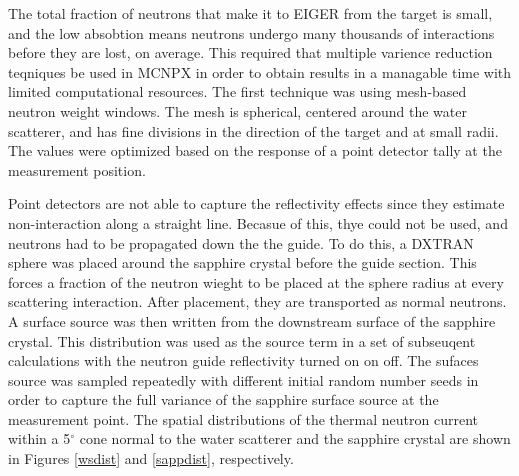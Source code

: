 \documentclass[a4paper,
              ]{jacow}
\begin{document}
The total fraction of neutrons that make it to EIGER from the target is small, and the low absobtion means neutrons undergo many thousands of interactions before they are lost, on average.  This required that multiple varience reduction teqniques be used in MCNPX in order to obtain results in a managable time with limited computational resources.  The first technique was using mesh-based neutron weight windows.  The mesh is spherical, centered around the water scatterer, and has fine divisions in the direction of the target and at small radii.  The values were optimized based on the response of a point detector tally at the measurement position.  %


Point detectors are not able to capture the reflectivity effects since they estimate non-interaction along a straight line.  Becasue of this, thye could not be used, and neutrons had to be propagated down the the guide.  To do this, a DXTRAN sphere was placed around the sapphire crystal before the guide section.  This forces a fraction of the neutron wieght to be placed at the sphere radius at every scattering interaction.  After placement, they are transported as normal neutrons.  A surface source was then written from the downstream surface of the sapphire crystal.  This distribution was used as the source term in a set of subseuqent calculations with the neutron guide reflectivity turned on on off.  The sufaces source was sampled repeatedly with different initial random number seeds in order to capture the full variance of the sapphire surface source at the measurement point.  The spatial distributions of the thermal neutron current within a 5$^\circ$ cone normal to the water scatterer and the sapphire crystal are shown in Figures \ref{wsdist} and \ref{sappdist}, respectively.
\end{document}
